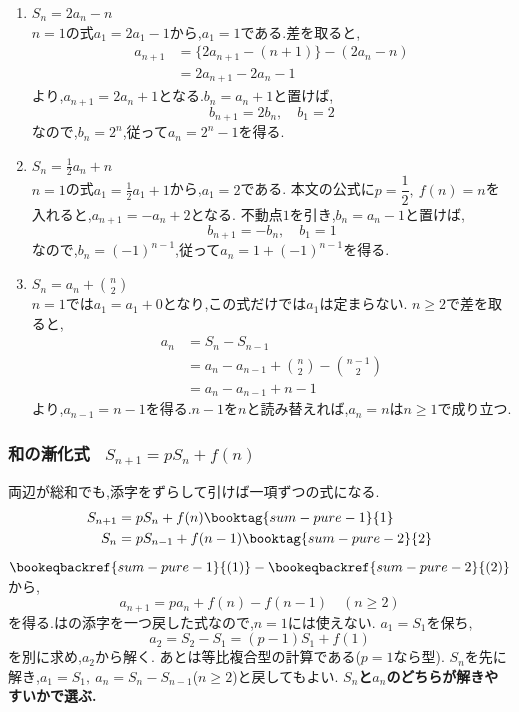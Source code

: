     \noindent{}\par\nobreak
    \begin{enumerate}[label=(\arabic*),parsep=3pt,format=\bookitemlink{example-summation-1}{solution}{problem}]
    \item $\displaystyle S_n=2a_n-n$\\
        $n=1$の式$a_1=2a_1-1$から,$a_1=1$である.差を取ると,
        \begin{align*}
          a_{n+1}&=\{2a_{n+1}-(n+1)\}-(2a_n-n)\\
          &=2a_{n+1}-2a_n-1
        \end{align*}
        より,$a_{n+1}=2a_n+1$となる.$b_n=a_n+1$と置けば,
        \[
          b_{n+1}=2b_n,\quad b_1=2
        \]
        なので,$b_n=2^n$,従って$a_n=2^n-1$を得る.
    \item $\displaystyle S_n=\frac12a_n+n$\\
        $n=1$の式$a_1=\frac12a_1+1$から,$a_1=2$である.
        本文の公式に$p=\dfrac{1}{2},\ f(n)=n$を入れると,$a_{n+1}=-a_n+2$となる.
        不動点$1$を引き,$b_n=a_n-1$と置けば,
        \[
          b_{n+1}=-b_n,\quad b_1=1
        \]
        なので,$b_n=(-1)^{n-1}$,従って$a_n=1+(-1)^{n-1}$を得る.
    \item $\displaystyle S_n=a_n+\binom n2$\\
        $n=1$では$a_1=a_1+0$となり,この式だけでは$a_1$は定まらない.
        $n\ge2$で差を取ると,
        \begin{align*}
          a_n&=S_n-S_{n-1}\\
          &=a_n-a_{n-1}+\binom n2-\binom{n-1}2\\
          &=a_n-a_{n-1}+n-1
        \end{align*}
        より,$a_{n-1}=n-1$を得る.$n-1$を$n$と読み替えれば,$a_n=n$は$n\ge1$で成り立つ.
    \end{enumerate}

  \subsubsection{\texorpdfstring{和の漸化式 \, $S_{n+1}=pS_n+f(n) $}{和の漸化式}}
    両辺が総和でも,添字をずらして引けば一項ずつの式になる.
    \begin{align*}
      S_{n+1}&=pS_n+f(n) \booktag{sum-pure-1}{1}\\
      S_n&=pS_{n-1}+f(n-1) \booktag{sum-pure-2}{2}
    \end{align*}
    $\bookeqbackref{sum-pure-1}{(1)}-\bookeqbackref{sum-pure-2}{(2)}$から,
    \[
      a_{n+1}=pa_n+f(n)-f(n-1)\quad(n\ge2)
    \]
    を得る.はの添字を一つ戻した式なので,$n=1$には使えない.
    $a_1=S_1$を保ち,
    \[
      a_2=S_2-S_1=(p-1)S_1+f(1)
    \]
    を別に求め,$a_2$から解く.
    あとは等比複合型の計算である($p=1$なら型).
    $S_n$を先に解き,$a_1=S_1,\ a_n=S_n-S_{n-1}$($n\ge2$)と戻してもよい.
    \textbf{$S_n$と$a_n$のどちらが解きやすいかで選ぶ.}

